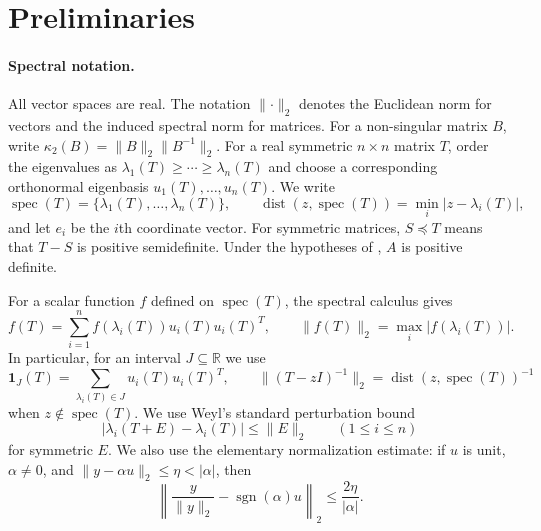 \documentclass[11pt]{article}
\begin{document}
\section{Preliminaries}
\label{sec:preliminaries}

\paragraph{Spectral notation.}
All vector spaces are real.  The notation $\lVert\cdot\rVert_2$ denotes the
Euclidean norm for vectors and the induced spectral norm for matrices.  For a
non-singular matrix $B$, write
$\kappa_2(B)=\lVert B\rVert_2\lVert B^{-1}\rVert_2$.  For a
real symmetric $n\times n$ matrix $T$, order the eigenvalues as
$\lambda_1(T)\geq\cdots\geq\lambda_n(T)$ and choose a corresponding
orthonormal eigenbasis $u_1(T),\ldots,u_n(T)$.  We write
\[
 \operatorname{spec}(T)=\{\lambda_1(T),\ldots,\lambda_n(T)\},
 \qquad
 \operatorname{dist}(z,\operatorname{spec}(T))
   =\min_i|z-\lambda_i(T)|,
\]
and let $e_i$ be the $i$th coordinate vector.  For symmetric matrices,
$S\preceq T$ means that $T-S$ is positive semidefinite.  Under the hypotheses
of , $A$ is positive definite.

For a scalar function $f$ defined on $\operatorname{spec}(T)$, the spectral
calculus gives
\begin{equation}
 \label{eq:spectral-calculus}
 f(T)=\sum_{i=1}^n f(\lambda_i(T))u_i(T)u_i(T)^T,
 \qquad
 \lVert f(T)\rVert_2=\max_i|f(\lambda_i(T))|.
\end{equation}
In particular, for an interval $J\subseteq\mathbb R$ we use
\[
 \mathbf 1_J(T)=\sum_{\lambda_i(T)\in J}u_i(T)u_i(T)^T,
 \qquad
 \lVert(T-zI)^{-1}\rVert_2
   =\operatorname{dist}(z,\operatorname{spec}(T))^{-1}
\]
when $z\notin\operatorname{spec}(T)$.  We use Weyl's standard perturbation
bound
\begin{equation}
 \label{eq:weyl}
 |\lambda_i(T+E)-\lambda_i(T)|\leq\lVert E\rVert_2
 \qquad(1\leq i\leq n)
\end{equation}
for symmetric $E$.  We also use the elementary normalization estimate: if
$u$ is unit, $\alpha\ne0$, and
$\lVert y-\alpha u\rVert_2\leq\eta<|\alpha|$, then
\begin{equation}
 \label{eq:normalization-stability}
 \left\lVert\frac{y}{\lVert y\rVert_2}
   -\operatorname{sgn}(\alpha)u\right\rVert_2
 \leq\frac{2\eta}{|\alpha|}.
\end{equation}
\end{document}
